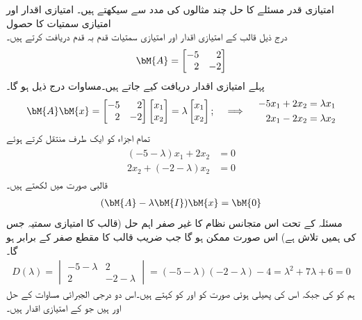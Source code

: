 امتیازی قدر مسئلے کا حل چند مثالوں کی مدد سے سیکھتے ہیں۔
\quad امتیازی اقدار اور امتیازی سمتیات کا حصول\\
درج ذیل قالب کے امتیازی اقدار اور امتیازی سمتیات قدم بہ قدم دریافت کرتے ہیں۔
\begin{align*}
\bM{A}=\begin{bmatrix*}[r] -5&2\\2&-2 \end{bmatrix*}
\end{align*}
پہلے امتیازی اقدار دریافت کیے جاتے ہیں۔مساوات  درج ذیل ہو گا۔
\begin{gather*}
\bM{A}\bM{x}=\begin{bmatrix*}[r] -5&2\\2&-2 \end{bmatrix*}\begin{bmatrix} x_1\\x_2 \end{bmatrix}=\lambda \begin{bmatrix} x_1\\x_2 \end{bmatrix};\quad \implies \quad \begin{aligned}-5x_1+2x_2&=\lambda x_1\\ 2x_1-2x_2&=\lambda x_2\end{aligned}
\end{gather*}
تمام اجزاء کو ایک طرف منتقل کرتے ہوئے
\begin{gather}
\begin{aligned}\label{مساوات_امتیازی_مثال_الف}
(-5-\lambda)x_1+2x_2&=0\\
2x_2+(-2-\lambda)x_2&=0
\end{aligned}
\end{gather}
قالبی صورت میں لکھتے ہیں۔
\begin{align*}
(\bM{A}-\lambda \bM{I})\bM{x}=\bM{0}
\end{align*}
مسئلہ  کے تحت اس متجانس نظام کا غیر صفر اہم حل  (قالب  کا امتیازی سمتیہ جس کی ہمیں تلاش ہے)  اس صورت ممکن ہو گا جب  ضریب  قالب کا مقطع صفر کے برابر ہو گا۔
\begin{align*}
D(\lambda)=\begin{vmatrix} -5-\lambda& 2\\ 2 & -2-\lambda \end{vmatrix}=(-5-\lambda)(-2-\lambda)-4=\lambda^2+7\lambda+6=0
\end{align*}
ہم  کو  کی  جبکہ اس کی پھیلی  ہوئی صورت کو  اور  کو  کہتے ہیں۔اس دو درجی الجبرائی مساوات کے حل  اور  ہیں جو  کے امتیازی اقدار ہیں۔

